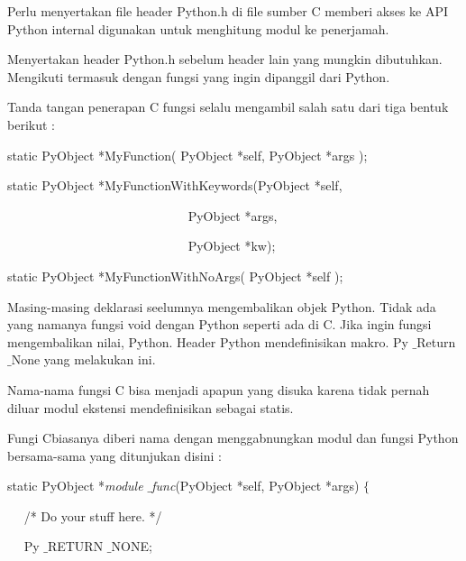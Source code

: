\documentclass[a4paper,12pt]{report}
\begin{document}
 \par
\vspace{12pt}
Perlu menyertakan file header Python.h di file sumber C memberi akses ke API Python internal digunakan untuk menghitung modul ke penerjamah. \par
Menyertakan header Python.h sebelum header lain yang mungkin dibutuhkan. Mengikuti termasuk dengan fungsi yang ingin dipanggil dari Python. \par
Tanda tangan penerapan C fungsi selalu mengambil salah satu dari tiga bentuk berikut : \par
\noindent 
{\fontsize{10pt}{10pt}\selectfont static PyObject *MyFunction( PyObject *self, PyObject *args );} \par
\noindent 
\vspace{10pt}
\noindent 
{\fontsize{10pt}{10pt}\selectfont static PyObject *MyFunctionWithKeywords(PyObject *self,} \par
\noindent 
{\fontsize{10pt}{10pt}\selectfont ~~~~~~~~~~~~~~~~~~~~~~~~~~~~ PyObject *args,} \par
\noindent 
{\fontsize{10pt}{10pt}\selectfont ~~~~~~~~~~~~~~~~~~~~~~~~~~~~ PyObject *kw);} \par
\noindent 
\vspace{10pt}
\noindent 
{\fontsize{10pt}{10pt}\selectfont static PyObject *MyFunctionWithNoArgs( PyObject *self );} \par
\vspace{12pt}
\noindent 
 \hspace*{0.5in} Masing-masing deklarasi seelumnya mengembalikan objek Python. Tidak ada yang namanya fungsi void dengan Python seperti ada di C. Jika ingin fungsi mengembalikan nilai, Python. Header Python mendefinisikan makro. Py $  \_  $Return $  \_  $None yang melakukan ini. \par
\noindent 
 \hspace*{0.5in} Nama-nama fungsi C bisa menjadi apapun yang disuka karena tidak pernah diluar modul ekstensi mendefinisikan sebagai statis. \par
\noindent 
 \hspace*{0.5in} Fungi Cbiasanya diberi nama dengan menggabnungkan modul dan fungsi Python bersama-sama yang ditunjukan disini : \par
\noindent 
static PyObject *\textit{module $  \_  $func}(PyObject *self, PyObject *args)  $  \{  $ \par
\noindent 
~~ /* Do your stuff here. */ \par
\noindent 
~~ Py $  \_  $RETURN $  \_  $NONE; \par
\end{document}
